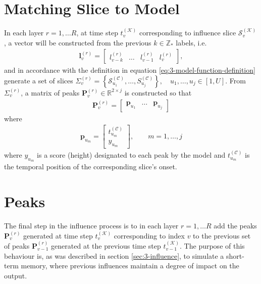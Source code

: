 \section{Matching Slice to Model}\label{sec:3-influence-model}
In each layer $r = 1,\dots R$, at time step $t^{(\mathcal K)}_v$ corresponding to influence slice $\mathcal S_v^{(\mathcal K)}$, a vector will be constructed from the previous  $k \in \mathbb Z_\ast$ labels, i.e.
\begin{align}
	\bm l_v^{(r)} = \begin{bmatrix} l_{v-k}^{(r)} & \dots & l_{v-1}^{(r)} & l_v^{(r)} \end{bmatrix},
\end{align}
and in accordance with the definition in equation \ref{eq:3-model-function-definition} generate a set of slices $\Sigma_v^{(r)} = \left\lbrace \mathcal S^{(\mathcal C)}_{u_1}, \dots, S^{(\mathcal C)}_{u_j}\right\rbrace, \quad u_1,\dots,u_j \in [1,U]$. From $\Sigma_v^{(r)}$, a matrix of peaks $\bm P_v^{(r)} \in \mathbb R^{2\times j}$ is constructed so that
\begin{align}
	\bm P_v^{(r)} = \begin{bmatrix} \bm p_{u_1} & \dots & \bm p_{u_j} \end{bmatrix}
\end{align}
where 
\begin{align}
	\bm p_{u_m} = \begin{bmatrix} t_{u_m}^{(\mathcal C)}  \\[0.17cm] y_{u_m} \end{bmatrix}, \qquad m = 1,\dots,j
\end{align}
where $y_{u_m}$ is a score (height) designated to each peak by the model and $t_{u_m}^{(\mathcal C)}$ is the temporal position of the corresponding slice's onset.


\section{Peaks}\label{sec:3-influence-peaks}
The final step in the influence process is to in each layer $r = 1,\dots R$ add the peaks $\bm P_v^{(r)}$ generated at time step $t^{(\mathcal K)}_v$ corresponding to index $v$ to the previous set of peaks $\bm P_{v-1}^{(r)}$ generated at the previous time step $t^{(\mathcal K)}_{v-1}$. The purpose of this behaviour is, as was described in section \ref{sec:3-influence}, to simulate a short-term memory, where previous influences maintain a degree of impact on the output. 

